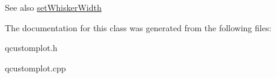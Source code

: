 \begin{DoxySeeAlso}{See also}
\hyperlink{classQCPStatisticalBox_adf378812446bd66f34d1f7f293d991cd}{set\+Whisker\+Width} 
\end{DoxySeeAlso}


The documentation for this class was generated from the following files\+:\begin{DoxyCompactItemize}
\item 
qcustomplot.\+h\item 
qcustomplot.\+cpp\end{DoxyCompactItemize}

